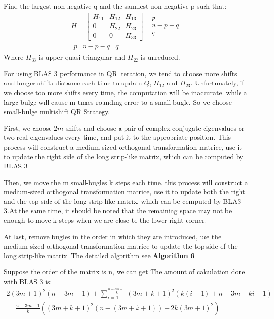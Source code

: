 Find the largest non-negative q and the samllest non-negative p such that:
\[\begin{array}{*{20}{c}}
{H = \left[ {\begin{array}{*{20}{c}}
{{H_{11}}}&{{H_{12}}}&{{H_{13}}}\\
0&{{H_{22}}}&{{H_{23}}}\\
0&0&{{H_{33}}}
\end{array}} \right]}&{\begin{array}{*{20}{c}}
p\\
{n-p-q}\\
q
\end{array}}\\
{\begin{array}{*{20}{c}}
p&{n-p-q}&q
\end{array}}&{}
\end{array}\]
Where \(H_{33}\) is upper quasi-triangular and \(H_{22}\) is unreduced.

For using BLAS 3 performance in QR iteration, we tend to choose more shifts and longer shifts distance each time to update \(Q\), \(H_{12}\) and \(H_{23}\). Unfortunately, if we choose too more shifts every time, the computation will be inaccurate, while a large-bulge will cause m times rounding error to a small-bugle. So we choose small-bulge multishift QR Strategy.

First, we choose \(2m\) shifts and choose a pair of complex conjugate eigenvalues or two real eigenvalues every time, and put it to the appropriate position. This process will construct a medium-sized orthogonal transformation matrice, use it to update the right side of the long strip-like matrix, which can be computed by BLAS 3.

Then, we move the m small-bugles k steps each time, this process will construct a medium-sized orthogonal transformation matrice, use it to update both the right and the top side of the long strip-like matrix, which can be computed by BLAS 3.At the same time, it should be noted that the remaining space may not be enough to move k steps when we are close to the lower right corner.

At last, remove bugles in the order in which they are introduced, use the medium-sized orthogonal transformation matrice to update the top side of the long strip-like matrix. The detailed algorithm see \textbf{Algorithm 6}


Suppose the order of the matrix is n, we can get The amount of calculation done with BLAS 3 is:
\[\begin{array}{l}
2{(3m + 1)^2}(n - 3m - 1) + \sum\limits_{i = 1}^{\frac{{n - 3m - 1}}{k}} {{{(3m + k + 1)}^2}(k(i - 1) + n - 3m - ki - 1)} \\
 = \frac{{n - 3m - 1}}{k}({(3m + k + 1)^2}(n - (3m + k + 1)) + 2k{(3m + 1)^2})
\end{array}\]

